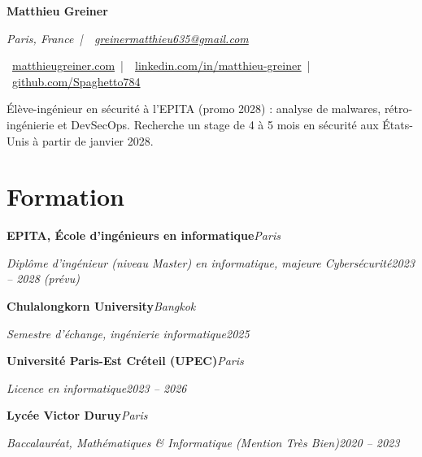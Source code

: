 \documentclass[10pt]{article}
\newcommand{\school}[4]{\textbf{#1}\hfill\textit{#2}\par\textit{#3}\hfill\textit{#4}\par}
\newcommand{\gap}{\vspace{4pt}}
\begin{document}
\fontsize{10.4}{12.4}\selectfont

{\LARGE\bfseries Matthieu Greiner}\par\vspace{2pt}
{\small\itshape
\faMapMarker* Paris, France \,|\,
\faEnvelope \ \href{mailto:greinermatthieu635@gmail.com}{greinermatthieu635@gmail.com}\par
\faGlobe \ \href{https://matthieugreiner.com}{matthieugreiner.com} \,|\,
\faLinkedin \ \href{https://www.linkedin.com/in/matthieu-greiner}{linkedin.com/in/matthieu-greiner} \,|\,
\faGithub \ \href{https://github.com/Spaghetto784}{github.com/Spaghetto784}\par}
\vspace{5pt}
{\small \'El\`eve-ing\'enieur en s\'ecurit\'e \`a l'EPITA (promo 2028) : analyse de malwares, r\'etro-ing\'enierie et DevSecOps.
Recherche un stage de 4 \`a 5 mois en s\'ecurit\'e aux \'Etats-Unis \`a partir de janvier 2028.\par}

\section{Formation}
\school{EPITA, \'Ecole d'ing\'enieurs en informatique}{Paris}{Dipl\^ome d'ing\'enieur (niveau Master) en informatique, majeure Cybers\'ecurit\'e}{2023 -- 2028 (pr\'evu)}\gap
\school{Chulalongkorn University}{Bangkok}{Semestre d'\'echange, ing\'enierie informatique}{2025}\gap
\school{Universit\'e Paris-Est Cr\'eteil (UPEC)}{Paris}{Licence en informatique}{2023 -- 2026}\gap
\school{Lyc\'ee Victor Duruy}{Paris}{Baccalaur\'eat, Math\'ematiques \& Informatique (Mention Tr\`es Bien)}{2020 -- 2023}
\end{document}

